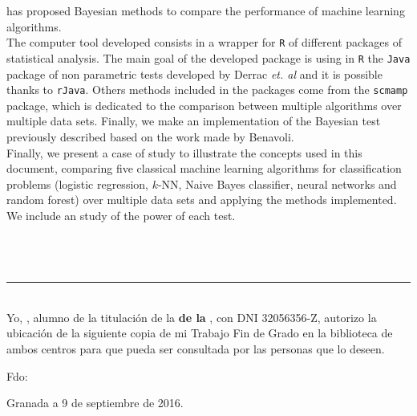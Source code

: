 has proposed Bayesian methods to compare the performance of 
machine learning algorithms. \\
	The computer tool developed consists in a wrapper for 
\texttt{R} of different packages of statistical analysis. The 
main goal of the developed package is using in \texttt{R} the 
\texttt{Java} package of non parametric tests developed by 
Derrac \textit{et. al} and it is possible thanks to 
\texttt{rJava}. Others methods included in the packages come 
from the \texttt{scmamp} package, which is dedicated to the 
comparison between multiple algorithms over multiple data 
sets. Finally, we make an implementation of the Bayesian test 
previously described based on the work made by Benavoli. \\
	Finally, we present a case of study to illustrate the 
concepts used in this document, comparing five classical 
machine learning algorithms for classification problems 
(logistic regression, $k$-NN, Naive Bayes classifier, neural 
networks and random forest) over multiple data sets and 
applying the methods implemented. We include an study of the 
power of each test. 

\\



\chapter*{}
\thispagestyle{empty}

\noindent\rule[-1ex]{\textwidth}{2pt}\\[4.5ex]

Yo, \textbf{\myName}, alumno de la titulación \myDegree de la \textbf{\myFaculty de la \myUni}, con DNI 32056356-Z, autorizo la
ubicación de la siguiente copia de mi Trabajo Fin de Grado en la biblioteca de ambos centros para que pueda ser
consultada por las personas que lo deseen.

\vspace{6cm}

\noindent Fdo: \myName

\vspace{2cm}

\begin{flushright}
Granada a 9 de septiembre de 2016.
\end{flushright}


